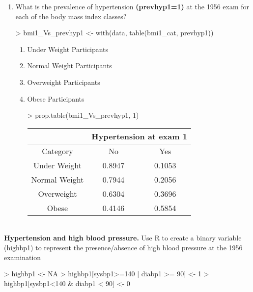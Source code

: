 \documentclass{article}
\begin{document}
\begin{enumerate}
  \item What is the prevalence of hypertension \textbf{(prevhyp1=1)} at the 1956 exam for each of the body mass index classes?

\begin{Schunk}
\begin{Sinput}
> bmi1_Vs_prevhyp1 <- with(data, table(bmi1_cat, prevhyp1))
\end{Sinput}
\end{Schunk}

\begin{enumerate}
  \item Under Weight Participants
  \item Normal Weight Participants
  \item Overweight Participants
  \item Obese Participants

\begin{Schunk}
\begin{Sinput}
> prop.table(bmi1_Vs_prevhyp1, 1)
\end{Sinput}
\end{Schunk}
\begin{table}[ht]
\begin{center}
\begin{tabular}{ccc}
& \multicolumn{2}{c}{Hypertension at exam 1}\\
  \hline
Category & No & Yes \\ 
  \hline
Under Weight & 0.8947 & 0.1053 \\ 
Normal Weight & 0.7944 & 0.2056 \\ 
Overweight & 0.6304 & 0.3696 \\ 
Obese & 0.4146 & 0.5854 \\ 
   \hline
\end{tabular}
\end{center}
\end{table}

\end{enumerate}
\end{enumerate}\\

\pagebreak
\textbf{Hypertension and high blood pressure.} Use R to create a binary variable (highbp1) to represent the presence/absence of high blood pressure at the 1956 examination

\begin{Schunk}
\begin{Sinput}
> highbp1 <- NA
> highbp1[sysbp1>=140 | diabp1 >= 90] <- 1 
> highbp1[sysbp1<140 & diabp1 < 90] <- 0
\end{Sinput}
\end{Schunk}
\end{document}
